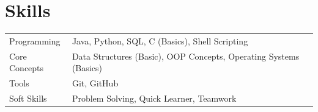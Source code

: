 \documentclass[a4paper,12pt]{article}
\begin{document}
\section{Skills}
\begin{tabularx}{\linewidth}{@{}l X@{}}

Programming & Java, Python, SQL, C (Basics), Shell Scripting \\

Core Concepts & Data Structures (Basic), OOP Concepts, Operating Systems (Basics) \\  

Tools & Git, GitHub \\

Soft Skills & Problem Solving, Quick Learner, Teamwork \\

\end{tabularx}

\vfill
{}
\end{document}
